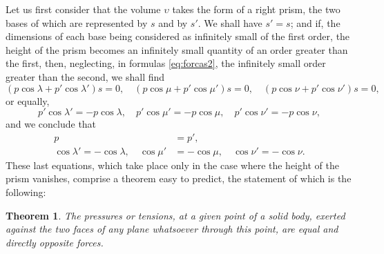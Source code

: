 \documentclass[leqno,openright,smallroyalvopaper,8pt,twoside,showtrims]{memoir}
\newtheorem{thm}{Theorem}
\begin{document}
Let us first consider that the volume $\upsilon$ takes the form of a right prism, the two bases of which are represented by $s$ and by $s'$. We shall have $s'=s$; and if, the dimensions of each base being considered as infinitely small of the first order, the height of the prism becomes an infinitely small quantity of an order greater than the first, then, neglecting, in formulas \eqref{eq:forcas2}, the infinitely small order greater than the second, we shall find
\begin{equation*}
(p\cos\lambda+p'\cos\lambda')s=0, \quad(p\cos\mu+p'\cos\mu')s=0,\quad(p\cos\nu+p'\cos\nu')s=0,
\end{equation*}
or equally,
\begin{equation*}
p'\cos\lambda'=-p\cos\lambda, \quad p'\cos\mu'=-p\cos\mu,\quad p'\cos\nu'=-p\cos\nu,
\end{equation*}
and we conclude that
\begin{align*}
p&=p',\\
\cos\lambda'=-\cos\lambda,\quad \cos\mu'&=-\cos\mu,\quad \cos\nu'=-\cos\nu.
\end{align*}
These last equations, which take place only in the case where the height of the prism vanishes, comprise a theorem easy to predict, the statement of which is the following:
\begin{thm}
The pressures or tensions, at a given point of a solid body, exerted against the two faces of any plane whatsoever through this point, are equal and directly opposite forces.
\end{thm} 
\end{document}

